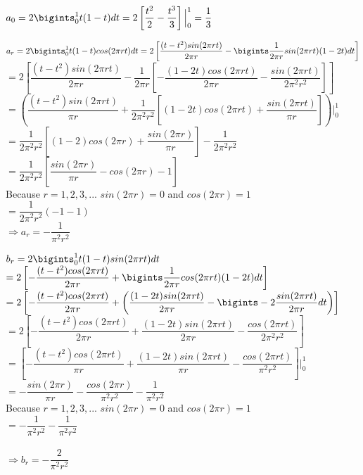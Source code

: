 \documentclass[fleqn]{article}
\begin{document}
\begin{enumerate}
    \textcolor{hwColor}{ 
      $a_0=2\bigints_{0}^{1}t(1-t)dt=2\left[\dfrac{t^2}{2}-\dfrac{t^3}{3}\right]\Big|_{0}^{1}=\dfrac{1}{3}$ \\
    }

    \textcolor{hwColor}{
      $a_r=2\bigints_{0}^{1}t(1-t) cos(2\pi rt)dt=2\left[\dfrac{(t-t^2)sin(2\pi rt)}{2\pi r}-\bigints \dfrac{1}{2 \pi r} sin(2\pi rt)(1-2t)dt\right]$ \\
      $=2\left[\dfrac{(t-t^2)sin(2\pi rt)}{2\pi r}-\dfrac{1}{2\pi r}\left[-\dfrac{(1-2t)cos(2\pi rt)}{2\pi r}-\dfrac{sin(2\pi rt)}{2 \pi^2 r^2}\right]\right]$ \\
      $=\left(\dfrac{(t-t^2)sin(2 \pi rt)}{\pi r}+\dfrac{1}{2 \pi^2 r^2} \left[(1-2t)cos(2\pi rt)+\dfrac{sin(2 \pi rt)}{\pi r}\right]\right)\Big|_{0}^{1}$ \\
      $=\dfrac{1}{2 \pi^2 r^2}\left[(1-2)cos(2 \pi r)+\dfrac{sin(2 \pi r)}{\pi r}\right]-\dfrac{1}{2 \pi^2 r^2}$ \\
      $=\dfrac{1}{2 \pi^2 r^2}\left[\dfrac{sin(2 \pi r)}{\pi r}-cos(2 \pi r)-1\right]$ \\
      Because $r=1,2,3,...$ $sin(2 \pi r)=0$ and $cos(2 \pi r)=1$ \\
      $=\dfrac{1}{2 \pi^2 r^2}(-1-1)$ \\
      $\Longrightarrow a_r=-\dfrac{1}{\pi^2 r^2}$
    }

    \bigbreak

    \textcolor{hwColor}{
      $b_r=2\bigints_{0}^{1}t(1-t) sin(2\pi rt)dt$ \\ 
      $=2\left[-\dfrac{(t-t^2)cos(2\pi rt)}{2 \pi r}+ \bigints \dfrac{1}{2\pi r}cos(2 \pi rt)(1-2t)dt\right]$ \\
      $=2\left[-\dfrac{(t-t^2)cos(2\pi rt)}{2 \pi r}+\left(\dfrac{(1-2t)sin(2\pi rt)}{2 \pi r}-\bigints -2\dfrac{sin(2\pi rt)}{2 \pi r}dt\right)\right]$ \\
      $=2\left[-\dfrac{(t-t^2) cos(2 \pi rt)}{2 \pi r}+\dfrac{(1-2t)sin(2 \pi rt)}{2 \pi r}-\dfrac{cos(2 \pi rt)}{2 \pi^2 r^2}\right]$ \\
      $=\left[-\dfrac{(t-t^2) cos(2 \pi rt)}{\pi r}+\dfrac{(1-2t)sin(2 \pi rt)}{\pi r}-\dfrac{cos(2 \pi rt)}{\pi^2 r^2}\right]\Big|_{0}^{1}$ \\
      $=-\dfrac{sin(2\pi r)}{\pi r}-\dfrac{cos(2 \pi r)}{\pi^2 r^2}-\dfrac{1}{\pi^2 r^2}$ \\
      Because $r=1,2,3,...$ $sin(2 \pi r)=0$ and $cos(2 \pi r)=1$ \\
      $=-\dfrac{1}{\pi^2 r^2}-\dfrac{1}{\pi^2 r^2}$ \\
      \\
      $\Longrightarrow b_r=-\dfrac{2}{\pi^2 r^2}$
    }
  

\end{enumerate}
\end{document}
